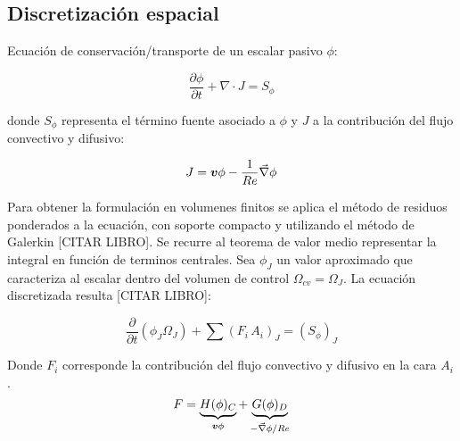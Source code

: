 
\subsection{Discretización espacial}

Ecuación de conservación/transporte de un escalar pasivo $\phi$:

\begin{equation} \label{transporte}
\dfrac{\partial \phi}{\partial t} + \nabla \cdot J = S_{\phi}
\end{equation}

donde $S_{\phi}$ representa el término fuente asociado a $\phi$ y $J$ a la contribución del flujo convectivo y difusivo:

\begin{equation}
J = \boldsymbol{v} \phi - \dfrac{1}{Re} \vec{\nabla} \phi
\end{equation}

Para obtener la formulación en volumenes finitos se aplica el método de residuos ponderados a la ecuación, con soporte compacto y utilizando el método de Galerkin [CITAR LIBRO]. Se recurre al teorema de valor medio representar la integral en función de terminos centrales. Sea $\phi_J$ un valor aproximado que caracteriza al escalar dentro del volumen de control $\Omega_{cv} = \Omega_J$. La ecuación discretizada resulta [CITAR LIBRO]:

\begin{equation}
\dfrac{\partial}{\partial t} \left( \phi_J \Omega_J \right) + \sum \left( F_i \, A_i \right)_J = \left( S_{\phi} \right)_J
\end{equation} 

Donde $F_i$ corresponde la contribución del flujo convectivo y difusivo en la cara $A_i$.
\begin{equation}
F = \underbrace{H(\phi)_C}_{\boldsymbol{v} \phi} + \underbrace{G(\phi)_D}_{-\vec{\nabla} \phi / Re}
\end{equation}



	

